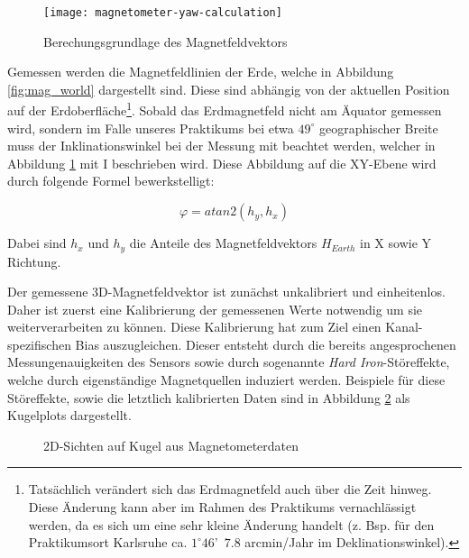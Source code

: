 \begin{figure}
   \centering
   \texttt{[image: magnetometer-yaw-calculation]}
   \caption[mag_mapping]{Berechungsgrundlage des Magnetfeldvektors}
   \label{fig:mag_mapping}
\end{figure}

Gemessen werden die Magnetfeldlinien der Erde, welche in Abbildung \ref{fig:mag_world} dargestellt sind.
Diese sind abhängig von der aktuellen Position auf der Erdoberfläche\footnote{Tatsächlich verändert sich das Erdmagnetfeld auch über die Zeit hinweg.
Diese Änderung kann aber im Rahmen des Praktikums vernachlässigt werden, da es sich um eine sehr kleine Änderung handelt (z. Bsp. für den Praktikumsort Karlsruhe ca. $1^\circ 46$'~$7.8$ arcmin/Jahr im Deklinationswinkel).}.
Sobald das Erdmagnetfeld nicht am Äquator gemessen wird, sondern im Falle unseres Praktikums bei etwa $49^\circ$ geographischer Breite muss der Inklinationswinkel bei der Messung mit beachtet werden, welcher in Abbildung \ref{fig:mag_mapping} mit I beschrieben wird.
Diese Abbildung auf die XY-Ebene wird durch folgende Formel bewerkstelligt:

\begin{equation}
    \varphi = atan2(h_y,h_x)
\end{equation}

Dabei sind $h_x$ und $h_y$ die Anteile des Magnetfeldvektors $H_{Earth}$ in X sowie Y Richtung.

Der gemessene 3D-Magnetfeldvektor ist zunächst unkalibriert und einheitenlos.
Daher ist zuerst eine Kalibrierung der gemessenen Werte notwendig um sie weiterverarbeiten zu können. 
Diese Kalibrierung hat zum Ziel einen Kanal-spezifischen Bias auszugleichen. 
Dieser entsteht durch die bereits angesprochenen Messungenauigkeiten des Sensors sowie durch sogenannte \textit{Hard Iron}-Störeffekte, welche durch eigenständige Magnetquellen induziert werden.
Beispiele für diese Störeffekte, sowie die letztlich kalibrierten Daten sind in Abbildung \ref{fig:mag_kugel_plots} als Kugelplots dargestellt.

\begin{figure}[ht]
\centering
{}

\caption[]{2D-Sichten auf Kugel aus Magnetometerdaten}
\label{fig:mag_kugel_plots}
\end{figure}


